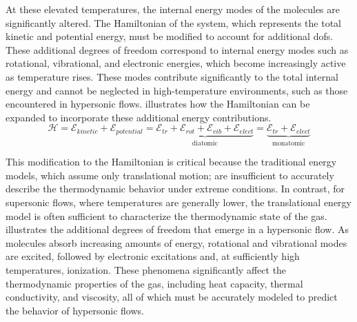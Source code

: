 \fi

        At these elevated temperatures, the internal energy modes of the
        molecules are significantly altered. The Hamiltonian of the system,
        which represents the total kinetic and potential energy, must be
        modified to account for additional \glspl{dof}. These additional degrees of
        freedom correspond to internal energy modes such as rotational,
        vibrational, and electronic energies, which become increasingly active
        as temperature rises. These modes contribute significantly to the total
        internal energy and cannot be neglected in high-temperature
        environments, such as those encountered in hypersonic flows.
         illustrates how the Hamiltonian
        can be expanded to incorporate these additional energy contributions.
        \begin{equation}\label{eq:hamiltonianEnergyExpansion}
            \mathcal{H} = \mathcal{E}_{kinetic} + \mathcal{E}_{potential} =
            \underbrace{\mathcal{E}_{tr} + \mathcal{E}_{rot} +
            \mathcal{E}_{vib} + \mathcal{E}_{elect}}_{\text{diatomic}} =
            \underbrace{\mathcal{E}_{tr}
            +\mathcal{E}_{elect}}_{\text{monatomic}} 
        \end{equation}

        This modification to the Hamiltonian is critical because the
        traditional energy models, which assume only translational motion; are
        insufficient to accurately describe the thermodynamic behavior under extreme
        conditions. In contrast, for supersonic flows, where temperatures are
        generally lower, the translational energy model is often sufficient to
        characterize the thermodynamic state of the gas.\\

         illustrates the additional degrees of
        freedom that emerge in a hypersonic flow. As molecules absorb
        increasing amounts of energy, rotational and vibrational modes are
        excited, followed by electronic excitations and, at sufficiently high
        temperatures, ionization. These phenomena significantly affect the
        thermodynamic properties of the gas, including heat capacity, thermal
        conductivity, and viscosity, all of which must be accurately modeled to
        predict the behavior of hypersonic flows. 

